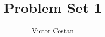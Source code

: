 \documentclass{article}
\newcommand{\PsetAuthorName}{Victor Costan}
\newcommand{\PsetTitle}{Problem Set 1}
\newcommand{\PsetMainFile}{6.878/ps1/all.tex}
\begin{document}
\title{\PsetClassNumber\space\PsetClassTerm\space\PsetTitle}
\author{\PsetAuthorName}
\maketitle


\end{document}
